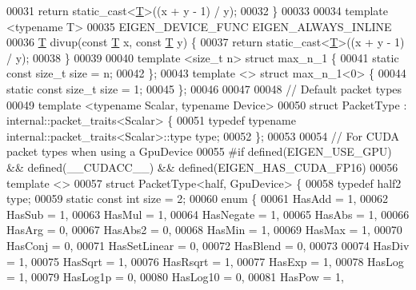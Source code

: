 \begin{DoxyCode}
00031   \textcolor{keywordflow}{return} \textcolor{keyword}{static\_cast<}\hyperlink{group___sparse_core___module_class_eigen_1_1_triplet}{T}\textcolor{keyword}{>}((x + y - 1) / y);
00032 \}
00033 
00034 \textcolor{keyword}{template} <\textcolor{keyword}{typename} T>
00035 EIGEN\_DEVICE\_FUNC EIGEN\_ALWAYS\_INLINE
00036 \hyperlink{group___sparse_core___module_class_eigen_1_1_triplet}{T} divup(\textcolor{keyword}{const} \hyperlink{group___sparse_core___module_class_eigen_1_1_triplet}{T} x, \textcolor{keyword}{const} \hyperlink{group___sparse_core___module_class_eigen_1_1_triplet}{T} y) \{
00037   \textcolor{keywordflow}{return} \textcolor{keyword}{static\_cast<}\hyperlink{group___sparse_core___module_class_eigen_1_1_triplet}{T}\textcolor{keyword}{>}((x + y - 1) / y);
00038 \}
00039 
00040 \textcolor{keyword}{template} <\textcolor{keywordtype}{size\_t} n> \textcolor{keyword}{struct }max\_n\_1 \{
00041   \textcolor{keyword}{static} \textcolor{keyword}{const} \textcolor{keywordtype}{size\_t} size = n;
00042 \};
00043 \textcolor{keyword}{template} <> \textcolor{keyword}{struct }max\_n\_1<0> \{
00044   \textcolor{keyword}{static} \textcolor{keyword}{const} \textcolor{keywordtype}{size\_t} size = 1;
00045 \};
00046 
00047 
00048 \textcolor{comment}{// Default packet types}
00049 \textcolor{keyword}{template} <\textcolor{keyword}{typename} Scalar, \textcolor{keyword}{typename} Device>
00050 \textcolor{keyword}{struct }PacketType : internal::packet\_traits<Scalar> \{
00051   \textcolor{keyword}{typedef} \textcolor{keyword}{typename} internal::packet\_traits<Scalar>::type type;
00052 \};
00053 
00054 \textcolor{comment}{// For CUDA packet types when using a GpuDevice}
00055 \textcolor{preprocessor}{#if defined(EIGEN\_USE\_GPU) && defined(\_\_CUDACC\_\_) && defined(EIGEN\_HAS\_CUDA\_FP16)}
00056 \textcolor{keyword}{template} <>
00057 \textcolor{keyword}{struct }PacketType<half, GpuDevice> \{
00058   \textcolor{keyword}{typedef} half2 type;
00059   \textcolor{keyword}{static} \textcolor{keyword}{const} \textcolor{keywordtype}{int} size = 2;
00060   \textcolor{keyword}{enum} \{
00061     HasAdd    = 1,
00062     HasSub    = 1,
00063     HasMul    = 1,
00064     HasNegate = 1,
00065     HasAbs    = 1,
00066     HasArg    = 0,
00067     HasAbs2   = 0,
00068     HasMin    = 1,
00069     HasMax    = 1,
00070     HasConj   = 0,
00071     HasSetLinear = 0,
00072     HasBlend  = 0,
00073 
00074     HasDiv    = 1,
00075     HasSqrt   = 1,
00076     HasRsqrt  = 1,
00077     HasExp    = 1,
00078     HasLog    = 1,
00079     HasLog1p  = 0,
00080     HasLog10  = 0,
00081     HasPow    = 1,

\end{DoxyCode}
